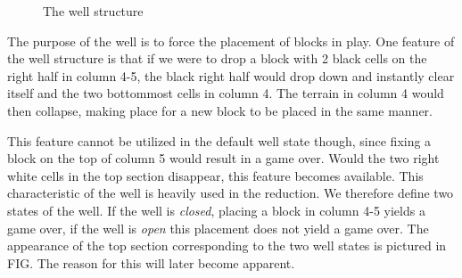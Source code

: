 \begin{figure}[H]
    \centering
    \caption{The well structure}
    \label{fig:wells}
\end{figure}

The purpose of the well is to force the placement of blocks in play. One feature of the well structure is that if we were to drop a block with 2 black cells on the right half in column 4-5, the black right half would drop down and instantly clear itself and the two bottommost cells in column 4. The terrain in column 4 would then collapse, making place for a new block to be placed in the same manner.

This feature cannot be utilized in the default well state though, since fixing a block on the top of column 5 would result in a game over. Would the two right white cells in the top section disappear, this feature becomes available. This characteristic of the well is heavily used in the reduction. We therefore define two states of the well. If the well is \textit{closed}, placing a block in column 4-5 yields a game over, if the well is \textit{open} this placement does not yield a game over. The appearance of the top section corresponding to the two well states is pictured in FIG. The reason for this will later become apparent.
